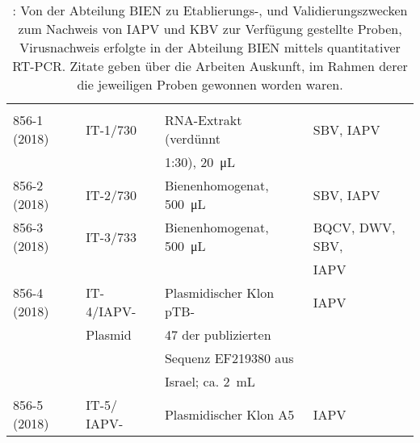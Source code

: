 \begin{table}
    \centering
    \caption{: Von der Abteilung BIEN zu Etablierungs-, und Validierungszwecken zum Nachweis von IAPV und KBV zur Verfügung gestellte Proben, Virusnachweis erfolgte in der Abteilung BIEN mittels quantitativer RT-PCR. Zitate geben über die Arbeiten Auskunft, im Rahmen derer die jeweiligen Proben gewonnen worden waren.}
    \label{tab:e:validierung}
    \begin{tabular}{*{4}{l}}
        \toprule
         &
         &
         &
         \\
        &&& \\
        \midrule
        856-1 (2018)    & IT-1/730              & RNA-Extrakt (verdünnt     & SBV, IAPV\\ 
                        &                       & 1:30), \SI{20}{\micro\liter}  &\\
        856-2 (2018)    & IT-2/730              & Bienenhomogenat, \SI{500}{\micro\liter} & SBV, IAPV\\ 
        856-3 (2018)    & IT-3/733              & Bienenhomogenat, \SI{500}{\micro\liter} & BQCV, DWV, SBV,\\
                        &                       &                           & IAPV\\
        856-4 (2018)    & IT-4/IAPV-            & Plasmidischer Klon pTB-   & IAPV\\
                        & Plasmid               & 47 der publizierten       &\\
                        &                       & Sequenz EF219380 aus      &\\
                        &                        & Israel; ca. \SI{2}{\milli\liter} &\\
        856-5 (2018)    & IT-5/ IAPV-           & Plasmidischer Klon A5     & IAPV\\

\end{tabular}
\end{table}
